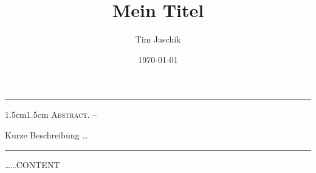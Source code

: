 \documentclass[10pt, letterpaper]{article}
\title{Mein Titel}
\author{Tim Jaschik}
\date{\today}
\renewenvironment{abstract}
  {
    \begin{adjustwidth}{1.5cm}{1.5cm}
    \small
    \textsc{Abstract. –}%
  }
  {
    \end{adjustwidth}
  }
\begin{document}
\maketitle
\rule{\textwidth}{0.5pt}
\begin{abstract}
Kurze Beschreibung …
\end{abstract}
\rule{\textwidth}{0.5pt}
\vspace{0.5cm}

\tableofcontents

\pagebreak

……CONTENT
\end{document}
